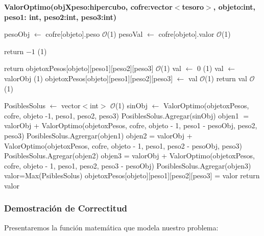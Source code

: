 \documentclass[spanish,12pt]{article}
\begin{document}
\begin{algorithm}[H]{\textbf{ValorOptimo(objXpeso:hipercubo, cofre:vector$<$tesoro$>$, objeto:int, peso1: int, peso2:int, peso3:int)}}
	\begin{algorithmic}[1]
		\State  pesoObj $\gets$ cofre[objeto].peso \Comment $\mathcal{O}$(1)
		\State  pesoVal $\gets$ cofre[objeto].valor \Comment $\mathcal{O}$(1)

			\State return $-1$ \Comment {}(1)

		\EndIf

			\State return objetoxPesos[objeto][peso1][peso2][peso3] \Comment $\mathcal{O}$(1)
		\EndIf
			\State val $\gets$ 0 \Comment {}(1)
				\State val $\gets$ valorObj \Comment {}(1)
				\State objetoxPesos[objeto][peso1][peso2][peso3] $\gets$ val \Comment $\mathcal{O}$(1)
				\State return val \Comment $\mathcal{O}$(1)
			\EndIf

		\Else
			\State PosiblesSolus $\gets$ vector$<$int$>$ \Comment $\mathcal{O}$(1)
			\State sinObj $\gets$ ValorOptimo(objetoxPesos, cofre, objeto -1, peso1, peso2, peso3)
			\State PosiblesSolus.Agregar(sinObj)
				\State objen1 $=$ valorObj + ValorOptimo(objetoxPesos, cofre, objeto - 1, peso1 - pesoObj, peso2, peso3)
				\State PosiblesSolus.Agrergar(objen1)
			\EndIf
				\State objen2 = valorObj + ValorOptimo(objetoxPesos, cofre, objeto - 1, peso1, peso2  - pesoObj, peso3)
				\State PosiblesSolus.Agregar(objen2)
			\EndIf
				\State objen3 = valorObj + ValorOptimo(objetoxPesos, cofre, objeto - 1, peso1, peso2, peso3  - pesoObj)
				\State PosiblesSolus.Agregar(objen3)
			\EndIf
			\State valor=Max(PsiblesSolus)
			\State objetoxPesos[objeto][peso1][peso2][peso3] = valor
			\State return valor
		\EndIf


	\end{algorithmic}
\end{algorithm}

\newpage

\subsubsection{Demostración de Correctitud}
Presentaremos la función matemática que modela nuestro problema:\\
\end{document}
